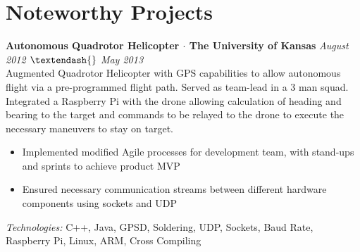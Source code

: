 \documentclass[10pt]{article}
\begin{document}
\section*{Noteworthy Projects}
\textbf{Autonomous Quadrotor Helicopter $\cdot$ The University of Kansas} \hfill \textit{August 2012  $\textendash{}$ May 2013} \\
Augmented Quadrotor Helicopter with GPS capabilities to allow autonomous flight via a pre-programmed flight path. Served as team-lead in a 3 man squad. Integrated a Raspberry Pi with the drone allowing calculation of heading and bearing to the target and commands to be relayed to the drone to execute the necessary maneuvers to stay on target.
\begin{itemize}
  \item Implemented modified Agile processes for development team, with stand-ups and sprints to achieve product MVP
  \item Ensured necessary communication streams between different hardware components using sockets and UDP
\end{itemize}
\textit{Technologies:} C++, Java, GPSD, Soldering, UDP, Sockets, Baud Rate, Raspberry Pi, Linux, ARM, Cross Compiling
\end{document}
